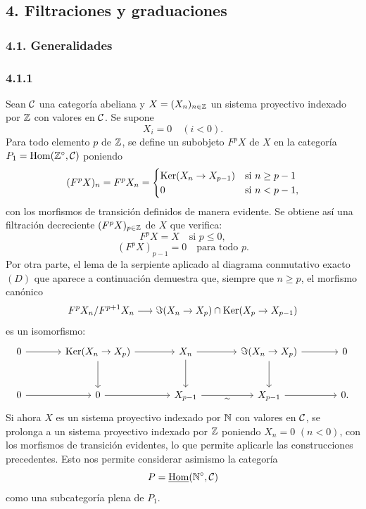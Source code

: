 \subsection*{4. Filtraciones y graduaciones}
\subsubsection*{4.1. Generalidades}
\subsubsection*{4.1.1}
Sean $\mathcal C$ una categoría abeliana y $X=(X_n)_{n\in\mathbb Z}$ un sistema proyectivo indexado por $\mathbb Z$ con valores en $\mathcal C$. Se supone
\[
X_i=0\quad(i<0).
\]
Para todo elemento $p$ de $\mathbb Z$, se define un subobjeto $F^pX$ de $X$ en la categoría $P_1=\operatorname{Hom}(\mathbb Z^\circ,\mathcal C)$ poniendo
\[
(F^pX)_n=F^pX_n=
\begin{cases}
\operatorname{Ker}(X_n\to X_{p-1})& \text{si } n\ge p-1\\
0& \text{si } n<p-1,
\end{cases}
\]
con los morfismos de transición definidos de manera evidente. Se obtiene así una filtración decreciente $(F^pX)_{p\in\mathbb Z}$ de $X$ que verifica:
\begin{equation}\tag{a}
F^pX=X\quad\text{si }p\le0,
\end{equation}
\begin{equation}\tag{b}
(F^pX)_{p-1}=0\quad\text{para todo }p.
\end{equation}
Por otra parte, el lema de la serpiente aplicado al diagrama conmutativo exacto $(D)$ que aparece a continuación demuestra que, siempre que $n\ge p$, el morfismo canónico
\[
F^pX_n/F^{p+1}X_n\longrightarrow \Im(X_n\to X_p)\cap\operatorname{Ker}(X_p\to X_{p-1})
\]
es un isomorfismo:
\[
\begin{tikzcd}[column sep=large,row sep=large]
0 \arrow[r] & \Ker(X_n\to X_p) \arrow[r] \arrow[d] & X_n \arrow[r] \arrow[d] & \Im(X_n\to X_p) \arrow[r] \arrow[d] & 0\\
0 \arrow[r] & 0 \arrow[r] & X_{p-1} \arrow[r,"\sim"'] & X_{p-1} \arrow[r] & 0 .
\end{tikzcd}
\]
Si ahora $X$ es un sistema proyectivo indexado por $\mathbb N$ con valores en $\mathcal C$, se prolonga a un sistema proyectivo indexado por $\mathbb Z$ poniendo $X_n=0$ $(n<0)$, con los morfismos de transición evidentes, lo que permite aplicarle las construcciones precedentes. Esto nos permite considerar asimismo la categoría
\[
P=\underline{\operatorname{Hom}}(\mathbb N^\circ,\mathcal C)
\]
como una subcategoría plena de $P_1$.
